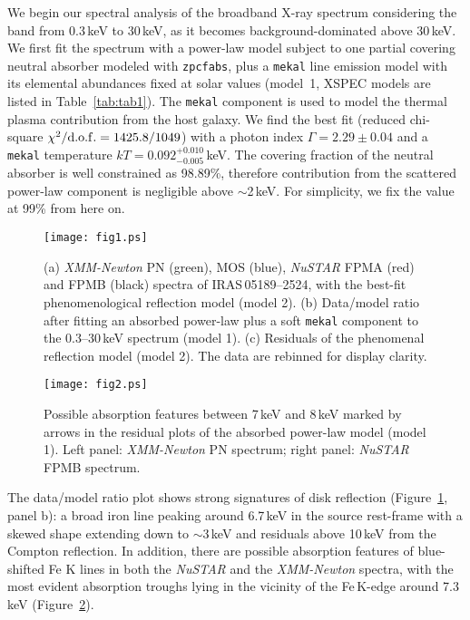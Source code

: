 \documentclass[]{emulateapj}
\def \nustar {{\em NuSTAR }}
\def \xmm {{\em XMM-Newton }}
\begin{document}
We begin our spectral analysis of the broadband X-ray spectrum considering the band from 0.3\,keV to 30\,keV, as it becomes background-dominated above 30\,keV. We first fit the spectrum with a power-law model subject to one partial covering neutral absorber modeled with {\tt zpcfabs}, plus a {\tt mekal} line emission model with its elemental abundances fixed at solar values (model~1, XSPEC models are listed in Table~\ref{tab:tab1}). The {\tt mekal} component is used to model the thermal plasma contribution from the host galaxy. We find the best fit (reduced chi-square $\chi^{2}/{\rm d.o.f.}=1425.8/1049$) with a photon index $\Gamma=2.29\pm0.04$ and a {\tt mekal} temperature $kT=0.092^{+0.010}_{-0.005}$\,keV. The covering fraction of the neutral absorber is well constrained as 98.89\%, therefore contribution from the scattered power-law component is negligible above $\sim$2\,keV. For simplicity, we fix the value at 99\% from here on.


\begin{figure}
\centering
\texttt{[image: fig1.ps]}
\caption{(a) \xmm PN (green), MOS (blue), \nustar FPMA (red) and FPMB (black) spectra of {IRAS\,05189--2524}, with the best-fit phenomenological reflection model (model 2).  (b) Data/model ratio after fitting an absorbed power-law plus a soft {\tt mekal} component to the 0.3--30\,keV spectrum (model 1). (c) Residuals of the phenomenal reflection model (model 2).  The data are rebinned for display clarity. 
\label{fig:fig1}}
\end{figure}

\begin{figure}
\centering
\texttt{[image: fig2.ps]}
\caption{Possible absorption features between 7\,keV and 8\,keV marked by arrows in the residual plots of the absorbed power-law model (model 1). Left panel: \xmm PN spectrum; right panel: \nustar FPMB spectrum.  
\label{fig:fig2}}
\end{figure}

The data/model ratio plot shows strong signatures of disk reflection (Figure~\ref{fig:fig1}, panel b): a broad iron line peaking around 6.7\,keV in the source rest-frame with a skewed shape extending down to $\sim$3\,keV and residuals above 10\,keV from the Compton reflection. In addition, there are possible absorption features of blue-shifted Fe K lines in both the \nustar and the \xmm spectra, with the most evident absorption troughs lying in the vicinity of the Fe\,K-edge around 7.3\,keV (Figure~\ref{fig:fig2}). 
\end{document}
